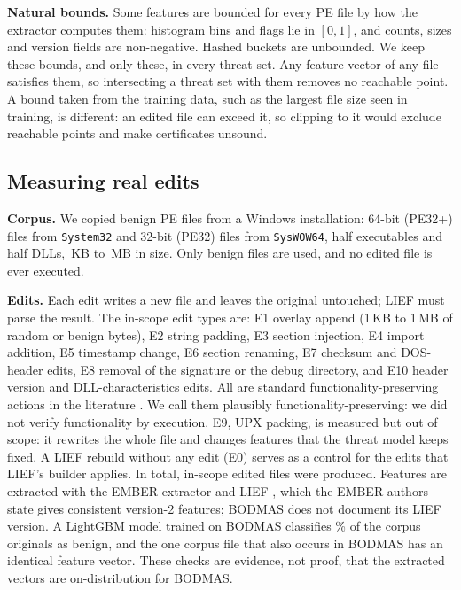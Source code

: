 \documentclass[preprint,12pt,authoryear]{elsarticle}
\begin{document}
\textbf{Natural bounds.} Some features are bounded for every PE file by how the extractor computes them: histogram bins and flags lie in $[0,1]$, and counts, sizes and version fields are non-negative. Hashed buckets are unbounded. We keep these bounds, and only these, in every threat set. Any feature vector of any file satisfies them, so intersecting a threat set with them removes no reachable point. A bound taken from the training data, such as the largest file size seen in training, is different: an edited file can exceed it, so clipping to it would exclude reachable points and make certificates unsound.

\subsection{Measuring real edits}\label{sec:measure}
\textbf{Corpus.} We copied \PsNFiles{} benign PE files from a Windows installation: \PsNFilesPeSixtyFour{} 64-bit (PE32+) files from \texttt{System32} and \PsNFilesPeThirtyTwo{} 32-bit (PE32) files from \texttt{SysWOW64}, half executables and half DLLs, \PsSizeMinKB{}\,KB to \PsSizeMaxMB{}\,MB in size. Only benign files are used, and no edited file is ever executed.

\textbf{Edits.} Each edit writes a new file and leaves the original untouched; LIEF \PsLiefVersion{} must parse the result. The in-scope edit types are: E1 overlay append (1\,KB to 1\,MB of random or benign bytes), E2 string padding, E3 section injection, E4 import addition, E5 timestamp change, E6 section renaming, E7 checksum and DOS-header edits, E8 removal of the signature or the debug directory, and E10 header version and DLL-characteristics edits. All are standard functionality-preserving actions in the literature \citep{anderson2018learning,demetrio2021exemples}. We call them plausibly functionality-preserving: we did not verify functionality by execution. E9, UPX packing, is measured but out of scope: it rewrites the whole file and changes features that the threat model keeps fixed. A LIEF rebuild without any edit (E0) serves as a control for the edits that LIEF's builder applies. In total, \PsNEditedInScope{} in-scope edited files were produced. Features are extracted with the EMBER extractor and LIEF \PsLiefVersion, which the EMBER authors state gives consistent version-2 features; BODMAS does not document its LIEF version. A LightGBM model trained on BODMAS classifies \XcBenignRate\% of the corpus originals as benign, and the one corpus file that also occurs in BODMAS has an identical feature vector. These checks are evidence, not proof, that the extracted vectors are on-distribution for BODMAS.
\end{document}
